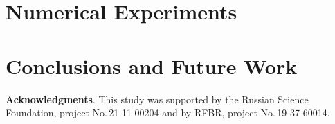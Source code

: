 \documentclass{svproc}
\begin{document}
\section{Numerical Experiments}\label{Sec_Exp}




\section{Conclusions and Future Work}



\medskip

\textbf{Acknowledgments}. This study was supported by the Russian Science Foundation, project No.\,21-11-00204 and by RFBR, project No.\,19-37-60014.

%
%

{}
\end{document}
